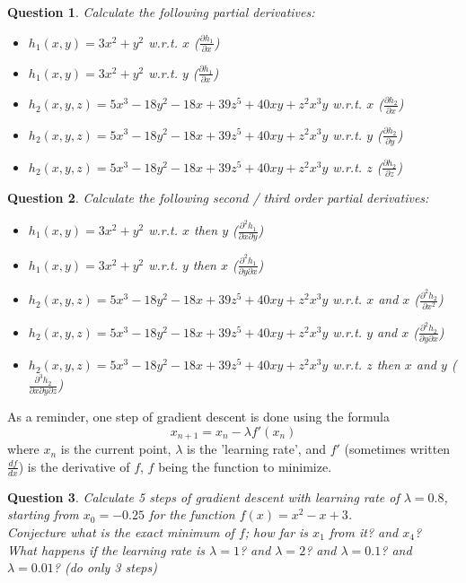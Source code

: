 \documentclass[]{article}
\newtheorem{question}{Question}
\begin{document}
	\begin{question}
		Calculate the following partial derivatives:\\
		\begin{itemize}
			\item $h_1(x,y) = 3x^2+y^2$ w.r.t. $x$ ($\frac{\partial h_1}{\partial x}$)
			\item $h_1(x,y) = 3x^2+y^2$ w.r.t. $y$ ($\frac{\partial h_1}{\partial x}$)
			\item $h_2(x,y,z) = 5x^3-18y^2-18x+39z^5+40xy+z^2x^3y$ w.r.t. $x$ ($\frac{\partial h_2}{\partial x}$)
			\item $h_2(x,y,z) = 5x^3-18y^2-18x+39z^5+40xy+z^2x^3y$ w.r.t. $y$ ($\frac{\partial h_2}{\partial y}$)
			\item $h_2(x,y,z) = 5x^3-18y^2-18x+39z^5+40xy+z^2x^3y$ w.r.t. $z$ ($\frac{\partial h_2}{\partial z}$)
		\end{itemize}
	\end{question}
	
	\begin{question}
		Calculate the following second / third order partial derivatives:\\
		\begin{itemize}
			\item $h_1(x,y) = 3x^2+y^2$ w.r.t. $x$ then $y$ ($\frac{\partial^2 h_1}{\partial x \partial y}$)
			\item $h_1(x,y) = 3x^2+y^2$ w.r.t. $y$ then $x$ ($\frac{\partial^2 h_1}{\partial y \partial x}$)
			\item $h_2(x,y,z) = 5x^3-18y^2-18x+39z^5+40xy+z^2x^3y$ w.r.t. $x$ and $x$ ($\frac{\partial^2 h_2}{\partial x^2}$)
			\item $h_2(x,y,z) = 5x^3-18y^2-18x+39z^5+40xy+z^2x^3y$ w.r.t. $y$ and $x$ ($\frac{\partial^2 h_2}{\partial y \partial x}$)
			\item $h_2(x,y,z) = 5x^3-18y^2-18x+39z^5+40xy+z^2x^3y$ w.r.t. $z$ then $x$ and $y$ ($\frac{\partial^3 h_2}{\partial x \partial y \partial z}$)
		\end{itemize}
	\end{question}
	
	\vspace{3cm}
	
	As a reminder, one step of gradient descent is done using the formula $$x_{n+1} = x_n -\lambda f'(x_n)$$
	where $x_n$ is the current point, $\lambda$ is the 'learning rate', and $f'$ (sometimes written $\frac{df}{dx}$) is the derivative of $f$, $f$ being the function to minimize.
	\begin{question}
		Calculate 5 steps of gradient descent with learning rate of $\lambda = 0.8$, starting from $x_0 = -0.25$ for the function $f(x) = x^2-x+3$.\\
		Conjecture what is the exact minimum of $f$; how far is $x_1$ from it? and $x_4$?\\
		What happens if the learning rate is $\lambda = 1$? and $\lambda = 2$? and $\lambda = 0.1$? and $\lambda = 0.01$? (do only 3 steps)
	\end{question}
	
	
\end{document}
